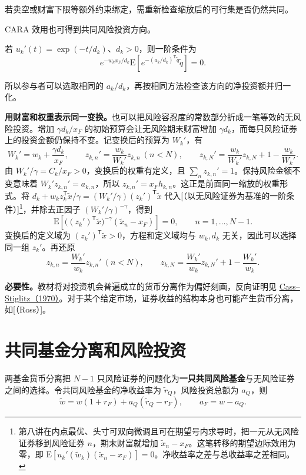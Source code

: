 若卖空或财富下限等额外约束绑定，需重新检查缩放后的可行集是否仍然共同。

CARA 效用也可得到共同风险投资方向。

\begin{solution}[label-content={证明},blank-type=none]
若 $u_k'(t)=\exp(-t/d_k)$、$d_k>0$，则一阶条件为
\[
 e^{-w_kx_F/d_k}\mathrm E[e^{-(a_k/d_k)^{\mathsf T}\tilde q}\tilde q]=0.
\]

所以参与者可以选取相同的 $a_k/d_k$，再按相同方法检查该方向的净投资额并归一化。
\end{solution}

\begin{solution}[label-content={证明},blank-type=none]
\textbf{用财富和权重表示同一变换。}也可以把风险容忍度的常数部分折成一笔等效的无风险投资。增加 $\gamma d_k/x_F$ 的初始预算会让无风险期末财富增加 $\gamma d_k$，而每只风险证券上的投资金额仍保持不变。记变换后的预算为 $W_k'$，有
\[
 W_k'=w_k+\frac{\gamma d_k}{x_F},\qquad
 z_{k,n}'=\frac{w_k}{W_k'}z_{k,n}\ (n<N),\qquad
 z_{k,N}'=\frac{w_k}{W_k'}z_{k,N}+1-\frac{w_k}{W_k'}.
\]
由 $W_k'/\gamma=C_k/x_F>0$，变换后的权重有定义，且 $\sum_n z_{k,n}'=1$。保持风险金额不变意味着 $W_k'z_{k,n}'=a_{k,n}$，所以 $z_{k,n}'=x_Fh_{k,n}$。这正是前面同一缩放的权重形式。将 $d_k+w_k z_k^{\mathsf T}\tilde x/\gamma=(W_k'/\gamma)(z_k')^{\mathsf T}\tilde x$ 代入[（以无风险证券为基准的一阶条件）]\footnote{第八讲在内点最优、头寸可双向微调且可在期望号内求导时，把一元从无风险证券移到风险证券 $n$，期末财富就增加 $\tilde x_n-x_F$。这笔转移的期望边际效用为零，即 $\mathrm E[u_k'(\tilde w_k)(\tilde x_n-x_F)]=0$。净收益率之差与总收益率之差相同。}，并除去正因子 $(W_k'/\gamma)^{-\gamma}$，得到
\[
 \mathrm E\!\left[\bigl((z_k')^{\mathsf T}\tilde x\bigr)^{-\gamma}
                    (\tilde x_n-x_F)\right]=0,
 \qquad n=1,\ldots,N-1.
\]
变换后的定义域为 $(z_k')^{\mathsf T}\tilde x>0$，方程和定义域均与 $w_k,d_k$ 无关，因此可以选择同一组 $z_k'$。再还原
\[
 z_{k,n}=\frac{W_k'}{w_k}z_{k,n}'\ (n<N),\qquad
 z_{k,N}=\frac{W_k'}{w_k}z_{k,N}'+1-\frac{W_k'}{w_k}.
\]
\end{solution}

\textbf{必要性。}教材将对投资机会普遍成立的货币分离作为偏好刻画，反向证明见 \href{https://www.sciencedirect.com/science/article/abs/pii/0022053170900025}{Cass--Stiglitz（1970）}。对于某个给定市场，证券收益的结构本身也可能产生货币分离，如[（Ross）]。

\section{共同基金分离和风险投资}\label{sec:wj-nine-3}
两基金货币分离把 $N-1$ 只风险证券的问题化为\textbf{一只共同风险基金}与无风险证券之间的选择。令共同风险基金的净收益率为 $\tilde r_Q$，风险投资总额为 $a_Q$，则
\[
 \tilde w=w(1+r_F)+a_Q(\tilde r_Q-r_F),\qquad a_F=w-a_Q.
\]


